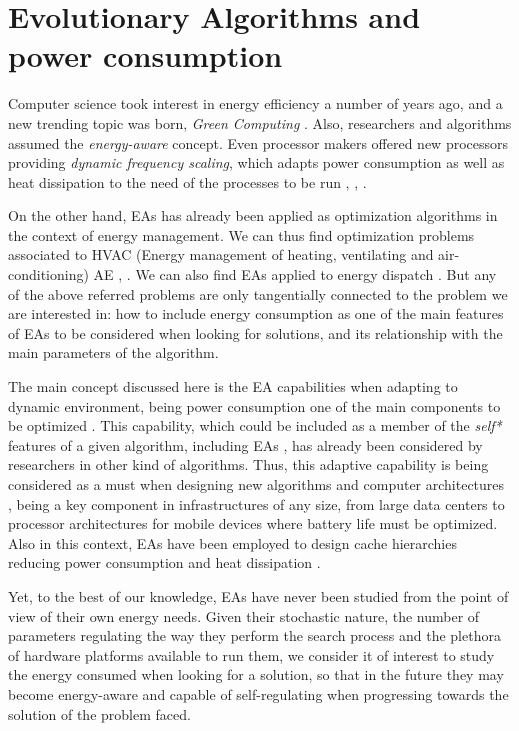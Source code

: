 \section{Evolutionary Algorithms and power consumption}
\label{eas}

Computer science took interest in energy efficiency a number of years
ago, and a new trending topic was born, \textit{Green Computing}
\cite{green-computing}.  Also, researchers and algorithms assumed the
\textit{energy-aware} \cite{energy-aware} concept.  Even processor
makers offered new processors providing \textit{dynamic frequency
  scaling}, which adapts power consumption as well as heat dissipation
to the need of the processes to be run \cite{scaling},
\cite{dynamic-scaling}, \cite{energy-efficient}. 

On the other hand, EAs has already been applied as optimization
algorithms in the context of energy management.  We can thus find
optimization problems associated to HVAC (Energy management of
heating, ventilating and air-conditioning) AE \cite{HVAC},
\cite{chiller}.  We can also find EAs applied to energy dispatch
\cite{dispatch}.  But any of the above referred problems are only
tangentially connected to the problem we are interested in:  how to
include energy consumption as one of the main features of EAs to be
considered when looking for solutions, and its relationship with the
main parameters of the algorithm. 

The main concept discussed here is the EA capabilities when adapting
to dynamic environment, being power consumption one of the main
components to be optimized \cite{ephemeral}. This capability, which
could be included as a member of the \textit{self*} features of a
given algorithm, including EAs \cite{self}, has already been
considered by researchers in other kind of algorithms.  Thus, this
adaptive capability is being considered as a must when designing new
algorithms and computer architectures \cite{energy-aware}, being a key
component in infrastructures of any size, from large data centers to
processor architectures for mobile devices where battery life must be
optimized.  Also in this context, EAs have been employed to design
cache hierarchies reducing power consumption and heat dissipation
\cite{cache}. 

Yet, to the best of our knowledge, EAs have never been studied from the point of view of their own energy needs.  %
Given their stochastic nature, the number of parameters regulating the
way they perform the search process and the plethora of hardware
platforms available to run them, we consider it of interest to study
the energy consumed when looking for a solution, so that in the future
they may become energy-aware and capable of self-regulating when
progressing towards the solution of the problem faced. 

